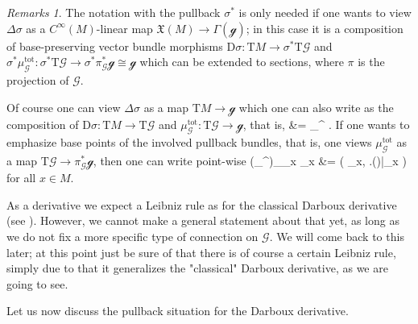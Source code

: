\documentclass[a4paper,oneside,11pt,bibliography=totoc]{scrartcl}
\def\bas#1\eas{\begin{align*}#1\end{align*}}
\theoremstyle{plain}
\theoremstyle{remark}
\newtheorem{remark}[theorem]{Remarks}
\theoremstyle{definition}
\begin{document}
\begin{remark}\label{RemarkABoutDarbouxNotationWRTPullback}
\leavevmode\newline
The notation with the pullback $\sigma^*$ is only needed if one wants to view $\Delta \sigma$ as a $C^\infty(M)$-linear map $\mathfrak{X}(M) \to \Gamma(\mathcal{g})$; in this case it is a composition of base-preserving vector bundle morphisms $\mathrm{D}\sigma: \mathrm{T}M \to \sigma^*\mathrm{T}\mathcal{G}$ and $\sigma^*\mu_{\mathcal{G}}^{\mathrm{tot}}: \sigma^*\mathrm{T}\mathcal{G} \to \sigma^*\pi_{\mathcal{G}}^*\mathcal{g} \cong \mathcal{g}$ which can be extended to sections, where $\pi$ is the projection of $\mathcal{G}$.

Of course one can view $\Delta \sigma$ as a map $\mathrm{T}M \to \mathcal{g}$ which one can also write as the composition of $\mathrm{D}\sigma: \mathrm{T}M \to \mathrm{T}\mathcal{G}$ and $\mu_{\mathcal{G}}^{\mathrm{tot}}: \mathrm{T}\mathcal{G} \to \mathcal{g}$, that is,
\bas
\Delta \sigma
&=
\mu_{}^{} \circ {}\sigma.
\eas
If one wants to emphasize base points of the involved pullback bundles, that is, one views $\mu_{\mathcal{G}}^{\mathrm{tot}}$ as a map $\mathrm{T}\mathcal{G} \to \pi_{\mathcal{G}}^*\mathcal{g}$, then one can write point-wise
\bas
\mleft(\mu_{}^{}\mright)_{\sigma_x} \circ {}_x\sigma
&=
\bigl(
	\sigma_x, \mleft.\mleft(\Delta \sigma\mright)\mright|_x
\bigr)
\eas
for all $x \in M$.
\end{remark}

As a derivative we expect a Leibniz rule as for the classical Darboux derivative (see \cite[\S 5.1, Eq.\ 2, page 182]{mackenzieGeneralTheory}). However, we cannot make a general statement about that yet, as long as we do not fix a more specific type of connection on $\mathcal{G}$. We will come back to this later; at this point just be sure of that there is of course a certain Leibniz rule, simply due to that it generalizes the "classical" Darboux derivative, as we are going to see.

Let us now discuss the pullback situation for the Darboux derivative.
\end{document}
